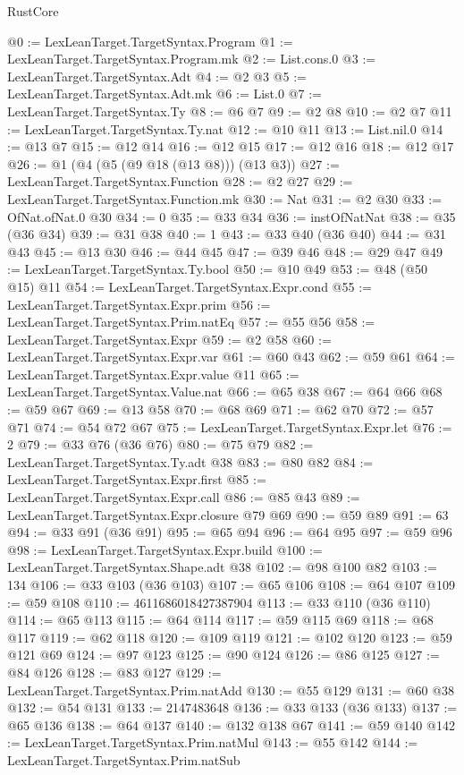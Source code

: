 \begin{lexlean}{RustCore}
\begin{coremodule}
@0 := LexLeanTarget.TargetSyntax.Program
@1 := LexLeanTarget.TargetSyntax.Program.mk
@2 := List.cons.{0}
@3 := LexLeanTarget.TargetSyntax.Adt
@4 := @2 @3
@5 := LexLeanTarget.TargetSyntax.Adt.mk
@6 := List.{0}
@7 := LexLeanTarget.TargetSyntax.Ty
@8 := @6 @7
@9 := @2 @8
@10 := @2 @7
@11 := LexLeanTarget.TargetSyntax.Ty.nat
@12 := @10 @11
@13 := List.nil.{0}
@14 := @13 @7
@15 := @12 @14
@16 := @12 @15
@17 := @12 @16
@18 := @12 @17
@26 := @1 (@4 (@5 (@9 @18 (@13 @8))) (@13 @3))
@27 := LexLeanTarget.TargetSyntax.Function
@28 := @2 @27
@29 := LexLeanTarget.TargetSyntax.Function.mk
@30 := Nat
@31 := @2 @30
@33 := OfNat.ofNat.{0} @30
@34 := 0
@35 := @33 @34
@36 := instOfNatNat
@38 := @35 (@36 @34)
@39 := @31 @38
@40 := 1
@43 := @33 @40 (@36 @40)
@44 := @31 @43
@45 := @13 @30
@46 := @44 @45
@47 := @39 @46
@48 := @29 @47
@49 := LexLeanTarget.TargetSyntax.Ty.bool
@50 := @10 @49
@53 := @48 (@50 @15) @11
@54 := LexLeanTarget.TargetSyntax.Expr.cond
@55 := LexLeanTarget.TargetSyntax.Expr.prim
@56 := LexLeanTarget.TargetSyntax.Prim.natEq
@57 := @55 @56
@58 := LexLeanTarget.TargetSyntax.Expr
@59 := @2 @58
@60 := LexLeanTarget.TargetSyntax.Expr.var
@61 := @60 @43
@62 := @59 @61
@64 := LexLeanTarget.TargetSyntax.Expr.value @11
@65 := LexLeanTarget.TargetSyntax.Value.nat
@66 := @65 @38
@67 := @64 @66
@68 := @59 @67
@69 := @13 @58
@70 := @68 @69
@71 := @62 @70
@72 := @57 @71
@74 := @54 @72 @67
@75 := LexLeanTarget.TargetSyntax.Expr.let
@76 := 2
@79 := @33 @76 (@36 @76)
@80 := @75 @79
@82 := LexLeanTarget.TargetSyntax.Ty.adt @38
@83 := @80 @82
@84 := LexLeanTarget.TargetSyntax.Expr.first
@85 := LexLeanTarget.TargetSyntax.Expr.call
@86 := @85 @43
@89 := LexLeanTarget.TargetSyntax.Expr.closure @79 @69
@90 := @59 @89
@91 := 63
@94 := @33 @91 (@36 @91)
@95 := @65 @94
@96 := @64 @95
@97 := @59 @96
@98 := LexLeanTarget.TargetSyntax.Expr.build
@100 := LexLeanTarget.TargetSyntax.Shape.adt @38
@102 := @98 @100 @82
@103 := 134
@106 := @33 @103 (@36 @103)
@107 := @65 @106
@108 := @64 @107
@109 := @59 @108
@110 := 4611686018427387904
@113 := @33 @110 (@36 @110)
@114 := @65 @113
@115 := @64 @114
@117 := @59 @115 @69
@118 := @68 @117
@119 := @62 @118
@120 := @109 @119
@121 := @102 @120
@123 := @59 @121 @69
@124 := @97 @123
@125 := @90 @124
@126 := @86 @125
@127 := @84 @126
@128 := @83 @127
@129 := LexLeanTarget.TargetSyntax.Prim.natAdd
@130 := @55 @129
@131 := @60 @38
@132 := @54 @131
@133 := 2147483648
@136 := @33 @133 (@36 @133)
@137 := @65 @136
@138 := @64 @137
@140 := @132 @138 @67
@141 := @59 @140
@142 := LexLeanTarget.TargetSyntax.Prim.natMul
@143 := @55 @142
@144 := LexLeanTarget.TargetSyntax.Prim.natSub

\end{coremodule}
\end{lexlean}
